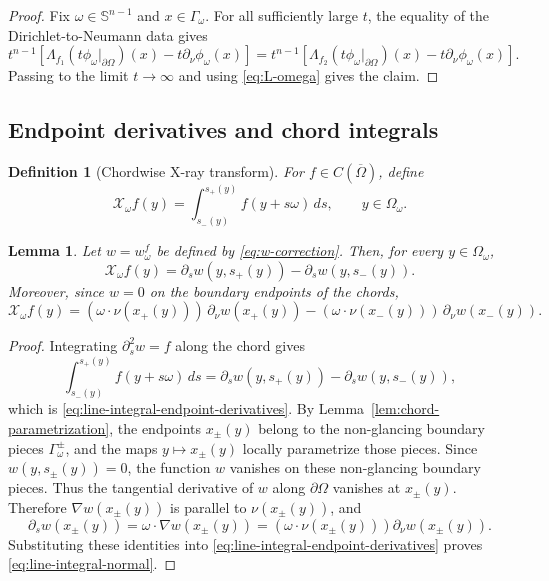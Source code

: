 \documentclass[11pt]{article}
\numberwithin{equation}{section}
\newtheorem{lemma}[theorem]{Lemma}
\newtheorem{definition}[theorem]{Definition}
\newcommand{\Sn}{\mathbb S^{n-1}}
\newcommand{\bd}{\partial}
\newcommand{\Om}{\Omega}
\newcommand{\DN}{\Lambda}
\newcommand{\Xray}{\mathcal X}
\begin{document}
\begin{proof}
Fix \(\omega\in\Sn\) and \(x\in\Gamma_\omega\).  For all sufficiently large \(t\), the equality of the Dirichlet-to-Neumann data gives
\[
    t^{n-1}
    \left[
        \DN_{f_1}(t\phi_\omega|_{\bd\Om})(x)
        -t\partial_\nu\phi_\omega(x)
    \right]
    =
    t^{n-1}
    \left[
        \DN_{f_2}(t\phi_\omega|_{\bd\Om})(x)
        -t\partial_\nu\phi_\omega(x)
    \right].
\]
Passing to the limit \(t\to\infty\) and using \eqref{eq:L-omega} gives the claim.
\end{proof}


\subsection{Endpoint derivatives and chord integrals}\label{subsec:endpoint-derivatives-chord-integrals}

\begin{definition}[Chordwise X-ray transform]\label{def:xray}
For \(f\in C(\overline\Om)\), define
\begin{equation}\label{eq:xray}
    \Xray_\omega f(y)
    =
    \int_{s_-(y)}^{s_+(y)}
        f(y+s\omega)\,ds,
    \qquad y\in\Omega_\omega.
\end{equation}
\end{definition}


\begin{lemma}\label{lem:endpoint-identity}
Let \(w=w_\omega^f\) be defined by \eqref{eq:w-correction}.  Then, for every \(y\in\Omega_\omega\),
\begin{equation}\label{eq:line-integral-endpoint-derivatives}
    \Xray_\omega f(y)
    =
    \partial_s w(y,s_+(y))
    -
    \partial_s w(y,s_-(y)).
\end{equation}
Moreover, since \(w=0\) on the boundary endpoints of the chords,
\begin{equation}\label{eq:line-integral-normal}
    \Xray_\omega f(y)
    =
    (\omega\cdot\nu(x_+(y)))\,\partial_\nu w(x_+(y))
    -
    (\omega\cdot\nu(x_-(y)))\,\partial_\nu w(x_-(y)).
\end{equation}
\end{lemma}

\begin{proof}
Integrating \(\partial_s^2w=f\) along the chord gives
\[
    \int_{s_-(y)}^{s_+(y)} f(y+s\omega)\,ds
    =
    \partial_s w(y,s_+(y))-
    \partial_s w(y,s_-(y)),
\]
which is \eqref{eq:line-integral-endpoint-derivatives}.  By Lemma~\ref{lem:chord-parametrization}, the endpoints \(x_\pm(y)\) belong to the non-glancing boundary pieces \(\Gamma_\omega^\pm\), and the maps \(y\mapsto x_\pm(y)\) locally parametrize those pieces.  Since \(w(y,s_\pm(y))=0\), the function \(w\) vanishes on these non-glancing boundary pieces.  Thus the tangential derivative of \(w\) along \(\bd\Om\) vanishes at \(x_\pm(y)\).  Therefore \(\nabla w(x_\pm(y))\) is parallel to \(\nu(x_\pm(y))\), and
\[
    \partial_s w(x_\pm(y))
    =
    \omega\cdot\nabla w(x_\pm(y))
    =
    (\omega\cdot\nu(x_\pm(y)))\partial_\nu w(x_\pm(y)).
\]
Substituting these identities into \eqref{eq:line-integral-endpoint-derivatives} proves \eqref{eq:line-integral-normal}.
\end{proof}
\end{document}
